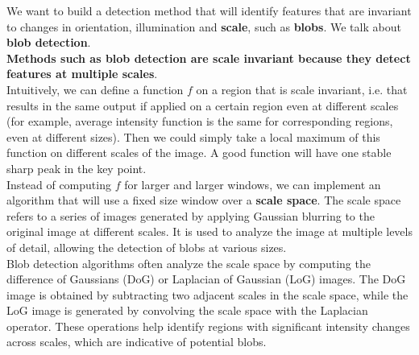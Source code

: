 \documentclass{article}
\begin{document}
We want to build a detection method that will identify features that are invariant to changes in orientation, illumination and \textbf{scale}, such as \textbf{blobs}. We talk about \textbf{blob detection}. \\ 

\textbf{Methods such as blob detection are scale invariant because they detect features at multiple scales}.\\

Intuitively, we can define a function $f$ on a region that is scale invariant, i.e. that results in the same output if applied on a certain region even at different scales (for example, average intensity function is the same for corresponding regions, even at different sizes). Then we could simply take a local maximum of this function on different scales of the image. A good function will have one stable sharp peak in the key point. \\

Instead of computing $f$ for larger and larger windows, we can implement an algorithm that will use a fixed size window over a \textbf{scale space}. The scale space refers to a series of images generated by applying Gaussian blurring to the original image at different scales. It is used to analyze the image at multiple levels of detail, allowing the detection of blobs at various sizes.\\ 

Blob detection algorithms often analyze the scale space by computing the difference of Gaussians (DoG) or Laplacian of Gaussian (LoG) images. The DoG image is obtained by subtracting two adjacent scales in the scale space, while the LoG image is generated by convolving the scale space with the Laplacian operator. These operations help identify regions with significant intensity changes across scales, which are indicative of potential blobs. \\

\end{document}
